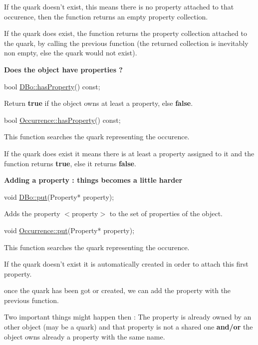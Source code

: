 If the quark doesn't exist, this means there is no property attached to that occurence, then the function returns an empty property collection.

If the quark does exist, the function returns the property collection attached to the quark, by calling the previous function (the returned collection is inevitably non empty, else the quark would not exist).

{\bfseries Does the object have properties ?} 
\begin{DoxyCode}
\textcolor{keywordtype}{bool} \hyperlink{classHurricane_1_1DBo_af03127d0697ce89e3640b5c3429d7752}{DBo::hasProperty}() \textcolor{keyword}{const};
\end{DoxyCode}
 Return {\bfseries true} if the object owns at least a property, else {\bfseries false}. 
\begin{DoxyCode}
\textcolor{keywordtype}{bool} \hyperlink{classHurricane_1_1Occurrence_a08cad18e47bd4bfee46fedeb4e85f502}{Occurrence::hasProperty}() \textcolor{keyword}{const};
\end{DoxyCode}
 This function searches the quark representing the occurence.

If the quark does exist it means there is at least a property assigned to it and the function returns {\bfseries true}, else it returns {\bfseries false}.

{\bfseries Adding a property \-: things becomes a little harder} 
\begin{DoxyCode}
\textcolor{keywordtype}{void} \hyperlink{classHurricane_1_1DBo_a8979674f11507cb4c7c5251b41ed72d5}{DBo::put}(Property* property);
\end{DoxyCode}
 Adds the property {\ttfamily $<$property$>$} to the set of properties of the object. 
\begin{DoxyCode}
\textcolor{keywordtype}{void} \hyperlink{classHurricane_1_1Occurrence_aaea0bdc4f5bb4012eb52f3abe20525be}{Occurrence::put}(Property* property);
\end{DoxyCode}
 This function searches the quark representing the occurence.

If the quark doesn't exist it is automatically created in order to attach this first property.

once the quark has been got or created, we can add the property with the previous function.

Two important things might happen then \-: The property is already owned by an other object (may be a quark) and that property is not a shared one {\bfseries and/or} the object owns already a property with the same name.

